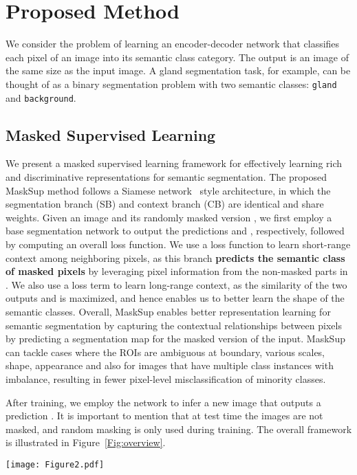 \documentclass{bmvc2k}
\begin{document}
\section{Proposed Method}
We consider the problem of learning an encoder-decoder network  that classifies each pixel of an image  into its semantic class category. The output is an image  of the same size as the input image. A gland segmentation task, for example, can be thought of as a binary segmentation problem with two semantic classes: \texttt{gland} and \texttt{background}.

\subsection{Masked Supervised Learning}
We present a masked supervised learning framework for effectively learning rich and discriminative representations for semantic segmentation. The proposed MaskSup method follows a Siamese network~\cite{bromley1993signature} style architecture, in which the segmentation branch (SB) and context branch (CB) are identical and share weights. Given an image  and its randomly masked version , we first employ a base segmentation network  to output the predictions  and , respectively, followed by computing an overall loss function. We use a loss function  to learn short-range context among neighboring pixels, as this branch \textbf{predicts the semantic class of masked pixels} by leveraging pixel information from the non-masked parts in . We also use a loss term  to learn long-range context, as the similarity of the two outputs  and  is maximized, and hence enables us to better learn the shape of the semantic classes. Overall, MaskSup enables better representation learning for semantic segmentation by capturing the contextual relationships between pixels by predicting a segmentation map for the masked version of the input. MaskSup can tackle cases where the ROIs are ambiguous at boundary, various scales, shape, appearance and also for images that have multiple class instances with imbalance, resulting in fewer pixel-level misclassification of minority classes.

After training, we employ the network  to infer a new image  that outputs a prediction . It is important to mention that at test time the images are not masked, and random masking is only used during training. The overall framework is illustrated in Figure~\ref{Fig:overview}.

\begin{figure*}[!htb]
\centering
\texttt{[image: Figure2.pdf]}
\caption{\textbf{Overview of MaskSup training}: joint prediction architecture with context branch and task similarity constraint for semantic segmentation, where  is a base segmentation network. The segmentation and context branches are identical and share weights.}
\label{Fig:overview}
\end{figure*}
\end{document}
